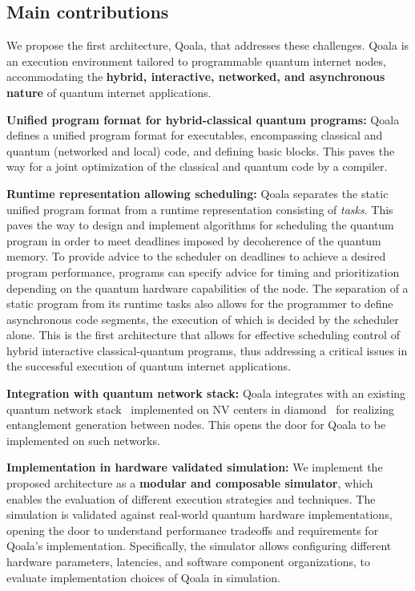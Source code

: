 \subsection{Main contributions}
We propose the first architecture, Qoala, that addresses these challenges. Qoala is an execution environment tailored to programmable quantum internet nodes, accommodating the \textbf{hybrid, interactive, networked, and asynchronous nature} of quantum internet applications. 

\textbf{Unified program format for hybrid-classical quantum programs:}
Qoala defines a unified program format for executables, encompassing classical and quantum (networked and local) code, and defining basic blocks.
This paves the way for a joint optimization of the classical and quantum code by a compiler.

\textbf{Runtime representation allowing scheduling:} Qoala separates the static unified program format from a runtime representation consisting of \textit{tasks}. 
This paves the way to design and implement algorithms for scheduling the quantum program in order to meet deadlines imposed by decoherence of the quantum memory.  
To provide advice to the scheduler on deadlines to achieve a desired program performance, programs can specify advice for timing and prioritization depending 
on the quantum hardware capabilities of the node. 
The separation of a static program from its runtime tasks also allows for the programmer to define asynchronous code segments, the execution of which is decided by the scheduler alone.
This is the first architecture that allows for effective scheduling control of hybrid interactive classical-quantum programs, thus addressing a critical issues in the successful execution of quantum internet applications.

\textbf{Integration with quantum network stack:}
Qoala integrates with an existing quantum network stack~\cite{dahlberg2019link} implemented on NV centers in diamond~\cite{pompili2022experimental} for realizing entanglement generation between nodes. This opens the door for Qoala to be implemented on such networks.

\textbf{Implementation in hardware validated simulation:} We implement the proposed architecture as a \textbf{modular and composable simulator}, which enables the evaluation of different execution strategies and techniques.
The simulation is validated against real-world quantum hardware implementations, opening the door to understand performance tradeoffs and requirements for Qoala's implementation. Specifically, the simulator allows 
configuring different hardware parameters, latencies, and software component organizations, to evaluate implementation choices of Qoala in simulation. 

